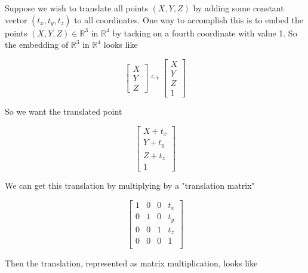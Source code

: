 \documentclass{article}
\theoremstyle{definition}
\begin{document}
\bigskip
\noindent
Suppose we wish to translate all points $(X, Y, Z)$ by adding some constant vector $(t_x, t_y, t_z)$ to all coordinates. One way to accomplish this is to embed 
the points $(X, Y, Z) \in \mathbb{R}^3$ in $\mathbb{R}^4$ by tacking on a fourth coordinate with value 1. So the embedding of $\mathbb{R}^3$ in 
$\mathbb{R}^4$ looks like

\bigskip
\begin{equation*}
\begin{bmatrix} X \\ Y \\ Z  \end{bmatrix} \hookrightarrow \begin{bmatrix} X \\ Y \\ Z \\ 1 \end{bmatrix} 
\end{equation*}

\bigskip
\noindent
So we want the translated point

\begin{equation*}
\begin{bmatrix} X + t_x \\ Y + t_y \\ Z + t_z \\ 1 \end{bmatrix} 
\end{equation*}


\bigskip
\noindent
We can get this translation by multiplying by a "translation matrix"

\begin{equation*}
\begin{bmatrix}  1 & 0 & 0 & t_x \\ 
                          0 & 1 & 0 & t_y \\ 
                          0 & 0 & 1 & t_z \\
                          0 & 0 & 0 & 1     \\
\end{bmatrix} 
\end{equation*}


\bigskip
\noindent
Then the translation, represented as matrix multiplication, looks like
\end{document}
